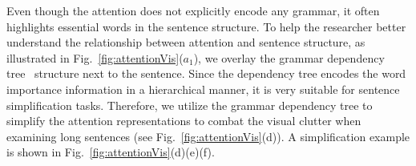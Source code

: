 Even though the attention does not explicitly encode any grammar, it often highlights essential words in the sentence structure.
%
To help the researcher better understand the relationship between attention and sentence structure, as illustrated in Fig.~\ref{fig:attentionVis}($a_{1}$), we overlay the grammar dependency tree~\cite{Nivre2005} structure next to the sentence.
%
Since the dependency tree encodes the word importance information in a hierarchical manner, it is very suitable for sentence simplification tasks.
Therefore, we utilize the grammar dependency tree to simplify the attention representations to combat the visual clutter when examining long sentences (see Fig.~\ref{fig:attentionVis}(d)). A simplification example is shown in  Fig.~\ref{fig:attentionVis}(d)(e)(f).




